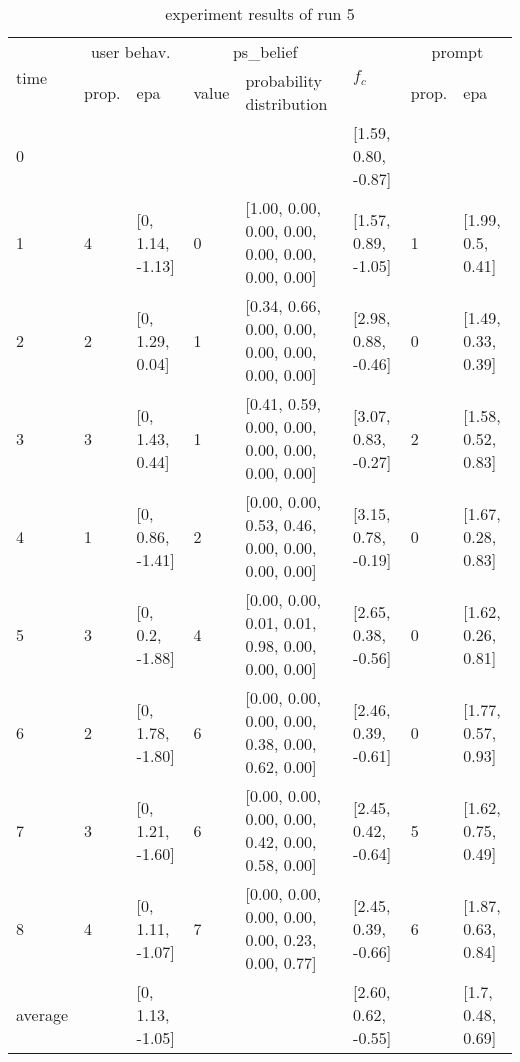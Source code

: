 \begin{table}[htbp]\footnotesize
\caption{experiment results of run 5}
\begin{center}
\begin{tabular}{|p{0.4cm}|p{0.6cm}|l|p{0.6cm}|p{3.3cm}|l|p{0.6cm}|l|}
\hline

\multirow{2}{*}{time} & \multicolumn{2}{c|}{user behav.} & \multicolumn{2}{c|}{ps\_belief} &
\multirow{2}{*}{$f_c$} & \multicolumn{2}{c|}{prompt} \\ \cline{2-5}\cline{ 7- 8}
& prop. & epa & value & probability distribution &  & prop. & epa \\ \hline

0 & \multicolumn{1}{l|}{} &  & \multicolumn{1}{l|}{} &  & [1.59, 0.80, -0.87] & \multicolumn{1}{l|}{} &  \\ \hline
1 & 4 & [0, 1.14, -1.13] & 0 & [1.00, 0.00, 0.00, 0.00, 0.00, 0.00, 0.00, 0.00] & [1.57, 0.89, -1.05] & 1 & [1.99, 0.5, 0.41] \\ \hline
2 & 2 & [0, 1.29, 0.04] & 1 & [0.34, 0.66, 0.00, 0.00, 0.00, 0.00, 0.00, 0.00] & [2.98, 0.88, -0.46] & 0 & [1.49, 0.33, 0.39] \\ \hline
3 & 3 & [0, 1.43, 0.44] & 1 & [0.41, 0.59, 0.00, 0.00, 0.00, 0.00, 0.00, 0.00] & [3.07, 0.83, -0.27] & 2 & [1.58, 0.52, 0.83] \\ \hline
4 & 1 & [0, 0.86, -1.41] & 2 & [0.00, 0.00, 0.53, 0.46, 0.00, 0.00, 0.00, 0.00] & [3.15, 0.78, -0.19] & 0 & [1.67, 0.28, 0.83] \\ \hline
5 & 3 & [0, 0.2, -1.88] & 4 & [0.00, 0.00, 0.01, 0.01, 0.98, 0.00, 0.00, 0.00] & [2.65, 0.38, -0.56] & 0 & [1.62, 0.26, 0.81] \\ \hline
6 & 2 & [0, 1.78, -1.80] & 6 & [0.00, 0.00, 0.00, 0.00, 0.38, 0.00, 0.62, 0.00] & [2.46, 0.39, -0.61] & 0 & [1.77, 0.57, 0.93] \\ \hline
7 & 3 & [0, 1.21, -1.60] & 6 & [0.00, 0.00, 0.00, 0.00, 0.42, 0.00, 0.58, 0.00] & [2.45, 0.42, -0.64] & 5 & [1.62, 0.75, 0.49] \\ \hline
8 & 4 & [0, 1.11, -1.07] & 7 & [0.00, 0.00, 0.00, 0.00, 0.00, 0.23, 0.00, 0.77] & [2.45, 0.39, -0.66] & 6 & [1.87, 0.63, 0.84] \\ \hline
\multicolumn{1}{|l|}{average} & \multicolumn{1}{l|}{} & [0, 1.13, -1.05] & \multicolumn{1}{l|}{} &  & [2.60, 0.62, -0.55] & \multicolumn{1}{l|}{} & [1.7, 0.48, 0.69] \\ \hline
\end{tabular}
\end{center}
\label{}
\end{table}


